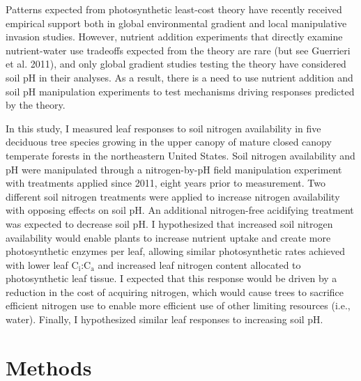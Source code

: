 Patterns expected from photosynthetic least-cost theory have recently received empirical support both in global environmental gradient  and local manipulative invasion  studies. However, nutrient addition experiments that directly examine nutrient-water use tradeoffs expected from the theory are rare (but see Guerrieri et al. 2011), and only global gradient studies testing the theory have considered soil pH in their analyses. As a result, there is a need to use nutrient addition and soil pH manipulation experiments to test mechanisms driving responses predicted by the theory.

In this study, I measured leaf responses to soil nitrogen availability in five deciduous tree species growing in the upper canopy of mature closed canopy temperate forests in the northeastern United States. Soil nitrogen availability and pH were manipulated through a nitrogen-by-pH field manipulation experiment with treatments applied since 2011, eight years prior to measurement. Two different soil nitrogen treatments were applied to increase nitrogen availability with opposing effects on soil pH. An additional nitrogen-free acidifying treatment was expected to decrease soil pH. I hypothesized that increased soil nitrogen availability would enable plants to increase nutrient uptake and create more photosynthetic enzymes per leaf, allowing similar photosynthetic rates achieved with lower leaf C$_\mathrm{i}$:C$_\mathrm{a}$ and increased leaf nitrogen content allocated to photosynthetic leaf tissue. I expected that this response would be driven by a reduction in the cost of acquiring nitrogen, which would cause trees to sacrifice efficient nitrogen use to enable more efficient use of other limiting resources (i.e., water). Finally, I hypothesized similar leaf responses to increasing soil pH.

\section{Methods}
